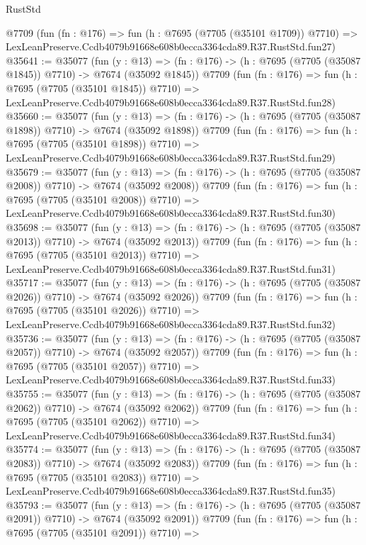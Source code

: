 \begin{lexlean}{RustStd}
\begin{coremodule}
    @7709
    (fun (fn : @176) =>
    fun (h : @7695 (@7705 (@35101 @1709)) @7710) =>
    LexLeanPreserve.Ccdb4079b91668e608b0ecca3364cda89.R37.RustStd.fun27)
@35641 := @35077
    (fun (y : @13) =>
    (fn : @176) -> (h : @7695 (@7705 (@35087 @1845)) @7710) -> @7674 (@35092 @1845))
    @7709
    (fun (fn : @176) =>
    fun (h : @7695 (@7705 (@35101 @1845)) @7710) =>
    LexLeanPreserve.Ccdb4079b91668e608b0ecca3364cda89.R37.RustStd.fun28)
@35660 := @35077
    (fun (y : @13) =>
    (fn : @176) -> (h : @7695 (@7705 (@35087 @1898)) @7710) -> @7674 (@35092 @1898))
    @7709
    (fun (fn : @176) =>
    fun (h : @7695 (@7705 (@35101 @1898)) @7710) =>
    LexLeanPreserve.Ccdb4079b91668e608b0ecca3364cda89.R37.RustStd.fun29)
@35679 := @35077
    (fun (y : @13) =>
    (fn : @176) -> (h : @7695 (@7705 (@35087 @2008)) @7710) -> @7674 (@35092 @2008))
    @7709
    (fun (fn : @176) =>
    fun (h : @7695 (@7705 (@35101 @2008)) @7710) =>
    LexLeanPreserve.Ccdb4079b91668e608b0ecca3364cda89.R37.RustStd.fun30)
@35698 := @35077
    (fun (y : @13) =>
    (fn : @176) -> (h : @7695 (@7705 (@35087 @2013)) @7710) -> @7674 (@35092 @2013))
    @7709
    (fun (fn : @176) =>
    fun (h : @7695 (@7705 (@35101 @2013)) @7710) =>
    LexLeanPreserve.Ccdb4079b91668e608b0ecca3364cda89.R37.RustStd.fun31)
@35717 := @35077
    (fun (y : @13) =>
    (fn : @176) -> (h : @7695 (@7705 (@35087 @2026)) @7710) -> @7674 (@35092 @2026))
    @7709
    (fun (fn : @176) =>
    fun (h : @7695 (@7705 (@35101 @2026)) @7710) =>
    LexLeanPreserve.Ccdb4079b91668e608b0ecca3364cda89.R37.RustStd.fun32)
@35736 := @35077
    (fun (y : @13) =>
    (fn : @176) -> (h : @7695 (@7705 (@35087 @2057)) @7710) -> @7674 (@35092 @2057))
    @7709
    (fun (fn : @176) =>
    fun (h : @7695 (@7705 (@35101 @2057)) @7710) =>
    LexLeanPreserve.Ccdb4079b91668e608b0ecca3364cda89.R37.RustStd.fun33)
@35755 := @35077
    (fun (y : @13) =>
    (fn : @176) -> (h : @7695 (@7705 (@35087 @2062)) @7710) -> @7674 (@35092 @2062))
    @7709
    (fun (fn : @176) =>
    fun (h : @7695 (@7705 (@35101 @2062)) @7710) =>
    LexLeanPreserve.Ccdb4079b91668e608b0ecca3364cda89.R37.RustStd.fun34)
@35774 := @35077
    (fun (y : @13) =>
    (fn : @176) -> (h : @7695 (@7705 (@35087 @2083)) @7710) -> @7674 (@35092 @2083))
    @7709
    (fun (fn : @176) =>
    fun (h : @7695 (@7705 (@35101 @2083)) @7710) =>
    LexLeanPreserve.Ccdb4079b91668e608b0ecca3364cda89.R37.RustStd.fun35)
@35793 := @35077
    (fun (y : @13) =>
    (fn : @176) -> (h : @7695 (@7705 (@35087 @2091)) @7710) -> @7674 (@35092 @2091))
    @7709
    (fun (fn : @176) =>
    fun (h : @7695 (@7705 (@35101 @2091)) @7710) =>

\end{coremodule}
\end{lexlean}

